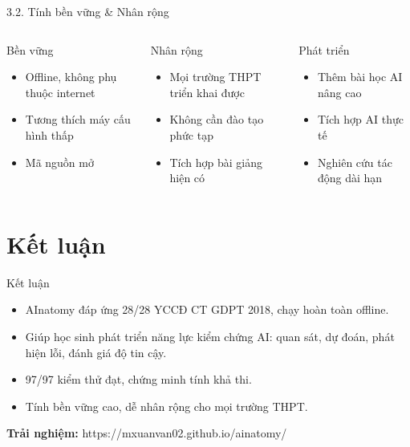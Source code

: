 \documentclass[10pt, aspectratio=169]{beamer}
\begin{document}
\begin{frame}{3.2. Tính bền vững \& Nhân rộng}
    \begin{columns}
        \begin{block}{Bền vững}
            \begin{itemize}
                \item Offline, không phụ thuộc internet
                \item Tương thích máy cấu hình thấp
                \item Mã nguồn mở
            \end{itemize}
        \end{block}
        \begin{block}{Nhân rộng}
            \begin{itemize}
                \item Mọi trường THPT triển khai được
                \item Không cần đào tạo phức tạp
                \item Tích hợp bài giảng hiện có
            \end{itemize}
        \end{block}
        \begin{block}{Phát triển}
            \begin{itemize}
                \item Thêm bài học AI nâng cao
                \item Tích hợp AI thực tế
                \item Nghiên cứu tác động dài hạn
            \end{itemize}
        \end{block}
    \end{columns}
\end{frame}

\section{Kết luận}

\begin{frame}{Kết luận}
    \begin{itemize}
        \item AInatomy đáp ứng 28/28 YCCĐ CT GDPT 2018, chạy hoàn toàn offline.
        \item Giúp học sinh phát triển năng lực kiểm chứng AI: quan sát, dự đoán, phát hiện lỗi, đánh giá độ tin cậy.
        \item 97/97 kiểm thử đạt, chứng minh tính khả thi.
        \item Tính bền vững cao, dễ nhân rộng cho mọi trường THPT.
    \end{itemize}
    
    \vspace{0.5em}
    \centering
    \textbf{Trải nghiệm:} https://mxuanvan02.github.io/ainatomy/
\end{frame}
\end{document}
